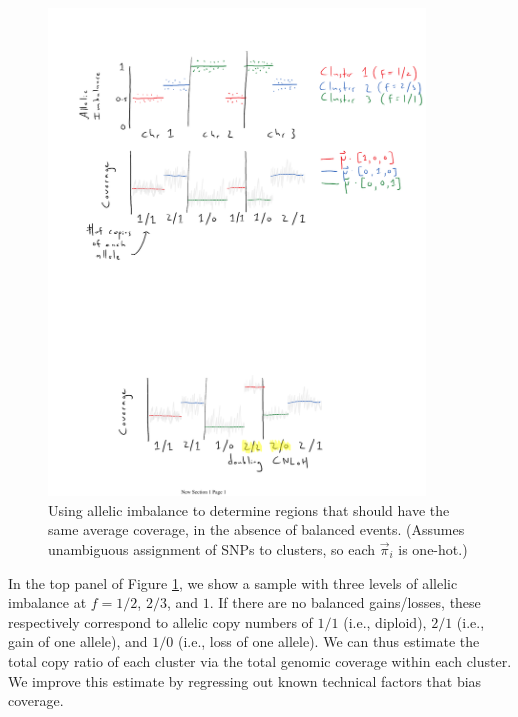 \documentclass[10pt,letter]{article}
\numberwithin{equation}{section}
\begin{document}
\begin{figure}
\centering
\includegraphics[trim={1cm 13cm 0 3cm},clip,width=10cm]{Figs/fig2.pdf}
\caption{Using allelic imbalance to determine regions that should have the same average coverage, in the absence of balanced events. (Assumes unambiguous assignment of SNPs to clusters, so each $\vec\pi_i$ is one-hot.)}
\label{NormFig}
\end{figure}

In the top panel of Figure \ref{NormFig}, we show a sample with three levels of allelic imbalance at $f=1/2$, $2/3$, and $1$. If there are no balanced gains/losses, these respectively correspond to allelic copy numbers of $1/1$ (i.e., diploid), $2/1$ (i.e., gain of one allele), and $1/0$ (i.e., loss of one allele). We can thus estimate the total copy ratio of each cluster via the total genomic coverage within each cluster. We improve this estimate by regressing out known technical factors that bias coverage.
\end{document}

